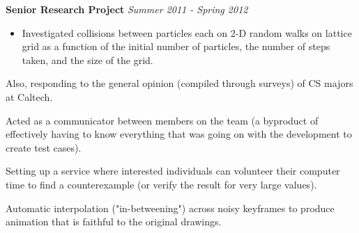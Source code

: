 \textbf{Senior Research Project} \hfill \emph{Summer 2011 - Spring 2012}
	\begin{itemize} \itemsep -0pt
		\item Investigated collisions between particles each on 2-D random walks on lattice grid as a function of the initial number of particles, the number of steps taken, and the size of the grid.
	\end{itemize}



 Also, responding to the general opinion (compiled through surveys) of CS majors at Caltech.

 \item Acted as a communicator between members on the team (a byproduct of effectively having to know everything that was going on with the development to create test cases).

 \item Setting up a service where interested individuals can volunteer their computer time to find a counterexample (or verify the result for very large values).


\item Automatic interpolation ("in-betweening") across noisy keyframes to produce animation that is faithful to the original drawings.


\smallskip


